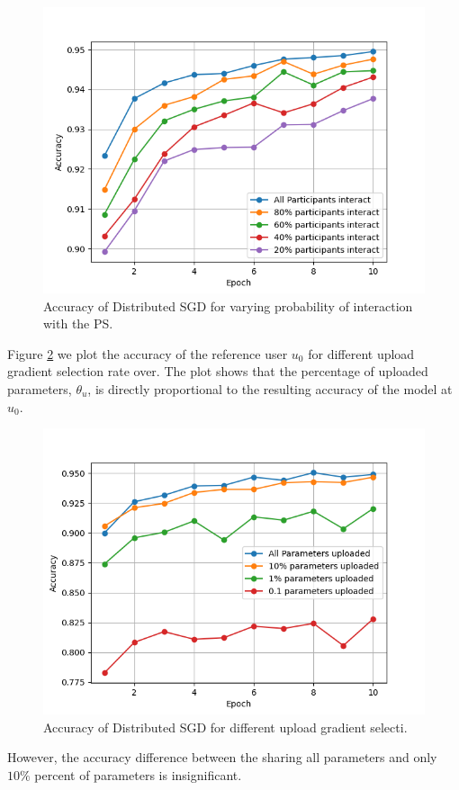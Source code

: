 \documentclass[letterpaper]{article}
\begin{document}
\begin{flushleft}
{\begin{figure}[H]
  \centering
    \includegraphics[width=5in]{VaryingProbabilityInteractionGrid.png}
    \caption[SGD for varying probability of interaction.]{\label{fig:VaryingProbabilityInteraction} Accuracy of Distributed SGD for varying probability of interaction with the PS.}
  \end{figure}




Figure \ref{fig:VaryingThetaU} we plot the accuracy of the reference user $u_0$ for different upload gradient selection rate over. 
The plot shows that the percentage of uploaded parameters, $\theta_u$, is directly proportional to the resulting accuracy of
the model at $u_0$. 

\begin{figure}[H]
  \centering
    \includegraphics[width=5in]{VaryingThetaUGrid.png}
    \caption[Varying upload gradient selection rate]{\label{fig:VaryingThetaU}Accuracy of Distributed SGD for different upload gradient selecti.}
  \end{figure}
However, the accuracy difference between the sharing all parameters and only $ 10\% $ percent of parameters is
insignificant.

}
\end{flushleft}
\end{document}
